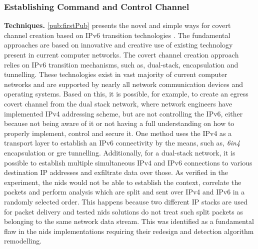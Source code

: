\subsubsection{Establishing Command and Control Channel}
\label{sec:cnc}
\textbf{Techniques.}
\ref{pub:firstPub} presents the novel and simple ways for covert channel creation based on IPv6 transition technologies \cite{Blumbergs2016}.
The fundamental approaches are based on innovative and creative use of existing technology present in current computer networks.
The covert channel creation approach relies on IPv6 transition mechanisms, such as, dual-stack, encapsulation and tunnelling. These technologies exist in vast majority of current computer networks and are supported by nearly all network communication devices and operating systems. Based on this, it is possible, for example, to create an egress covert channel from the dual stack network, where network engineers have implemented IPv4 addressing scheme, but are not controlling the IPv6, either because not being aware of it or not having a full understanding on how to properly implement, control and secure it. One method uses the IPv4 as a transport layer to establish an IPv6 connectivity by the means, such as, \textit{6in4} encapsulation or \gls{gre} tunnelling. Additionally, for a dual-stack network, it is possible to establish multiple simultaneous IPv4 and IPv6 connections to various destination IP addresses and exfiltrate data over those. As verified in the experiment, the \gls{nids} would not be able to establish the context, correlate the packets and perform analysis which are split and sent over IPv4 and IPv6 in a randomly selected order. This happens because two different IP stacks are used for packet delivery and tested \gls{nids} solutions do not treat such split packets as belonging to the same network data stream. This was identified as a fundamental flaw in the \gls{nids} implementations requiring their redesign and detection algorithm remodelling.

